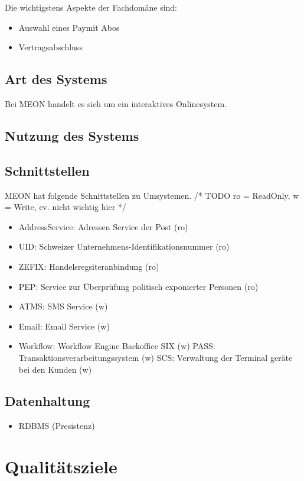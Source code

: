 Die wichtigstens Aspekte der Fachdomäne sind: 
\begin{itemize}
	\item Auswahl eines Paymit Abos
	\item Vertragsabschluss
\end{itemize}

\subsection{Art des Systems}

Bei MEON handelt es sich um ein interaktives Onlinesystem.

\subsection{Nutzung des Systems}

\subsection{Schnittstellen}

MEON hat folgende Schnittstellen zu Umsystemen. /* TODO ro = ReadOnly, w = Write, ev. nicht wichtig hier */
\begin{itemize}
	\item AddressService: Adressen Service der Post (ro)
	\item UID: Schweizer Unternehmens-Identifikationsnummer (ro) 
	\item ZEFIX: Handelsregsiteranbindung (ro)
	\item PEP: Service zur Überprüfung politisch exponierter Personen (ro)
	\item ATMS: SMS Service (w)
	\item Email: Email Service (w)
	\item Workflow: Workflow Engine Backoffice SIX (w)
	\subitem PASS: Transaktionsverarbeitungssystem (w)
	\subitem SCS:  Verwaltung der Terminal geräte bei den Kunden (w)
\end{itemize}

\subsection{Datenhaltung}

\begin{itemize}
	\item RDBMS (Presistenz)
\end{itemize}

\section{Qualitätsziele}

